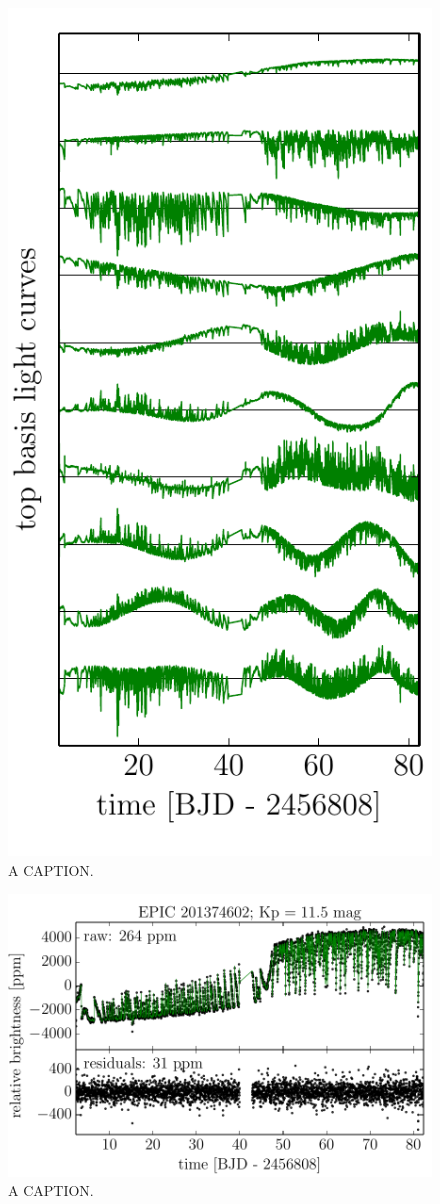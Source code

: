 \documentclass[12pt,preprint]{aastex}
\newcommand{\figlabel}[1]{\label{fig:#1}}
\begin{document}
\begin{figure}[p]
\begin{center}
\includegraphics{figures/pca.pdf}
\end{center}
\caption{%
A CAPTION.
\figlabel{pca}}
\end{figure}

\begin{figure}[p]
\begin{center}
\includegraphics{figures/corr.pdf}
\end{center}
\caption{%
A CAPTION.
\figlabel{corr}}
\end{figure}
\end{document}
